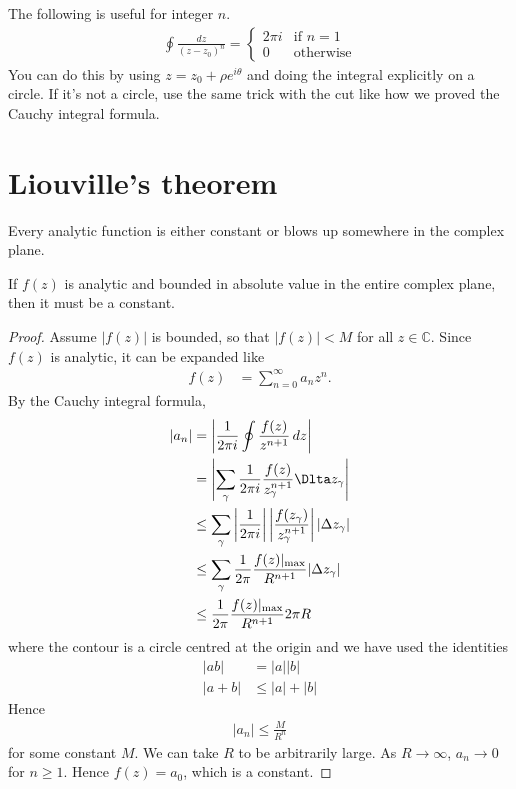 The following is useful for integer $n$.
\begin{align}
    \oint \frac{dz}{{(z - z_0)}^n}
    =
    \begin{cases}
        2\pi i & \text{if } n = 1\\
        0 & \text{otherwise}
    \end{cases}
\end{align}
You can do this by using $z = z_0 + \rho e^{i\theta}$
and doing the integral explicitly on a circle.
If it's not a circle,
use the same trick with the cut like how we proved the Cauchy integral formula.

\section{Liouville's theorem}
Every analytic function is either constant or blows up somewhere in the complex
plane.
\begin{theorem}
    If $f(z)$ is analytic and bounded in absolute value in the entire complex
    plane,
    then it must be a constant.
\end{theorem}
\begin{proof}
    Assume $|f(z)|$ is bounded,
    so that $|f(z)| < M$
    for all $z\in\mathbb{C}$.
    Since $f(z)$ is analytic,
    it can be expanded like
    \begin{align}
        f(z) &= \sum_{n=0}^{\infty} a_n z^{n}.
    \end{align}
    By the Cauchy integral formula,
    \begin{align}
        |a_n|
        &= \left|\frac{1}{2\pi i} \oint \frac{f(z)}{z^{n + 1}}\, dz\right|\\
        &=
        \left|
            \sum_\gamma \frac{1}{2\pi i}
            \frac{f(z)}{z_{\gamma}^{n + 1}}
            \Dlta z_\gamma
        \right|\\
        &\le
        \sum_{\gamma}
        \left|\frac{1}{2\pi i}\right|
        \left|\frac{f(z_\gamma)}{z_\gamma^{n + 1}}\right|
        \left|\Delta z_\gamma \right|\\
        &\le
        \sum_{\gamma}
        \frac{1}{2\pi}
        \frac{f(z)|_{\max}}{R^{n + 1}} |\Delta z_\gamma|\\
        &\le \frac{1}{2\pi} \frac{f(z)|_{\max}}{R^{n + 1}} 2\pi R
    \end{align}
    where the contour is a circle centred at the origin and
    we have used the identities
    \begin{align}
        |ab| &= |a||b|\\
        |a + b| &\le |a| + |b|
    \end{align}
    Hence
    \begin{align}
        |a_n| \le \frac{M}{R^n}
    \end{align}
    for some constant $M$.
    We can take $R$ to be arbitrarily large.
    As $R\to\infty$, $a_n\to 0$ for $n\ge 1$.
    Hence $f(z)=a_0$,
    which is a constant.
\end{proof}
